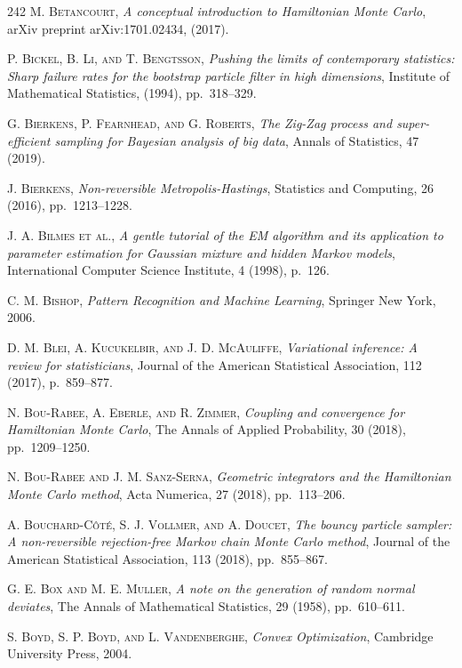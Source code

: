 \begin{thebibliography}{242}
\textsc{M. Betancourt},
\textit{A conceptual introduction to Hamiltonian Monte Carlo},
arXiv preprint arXiv:1701.02434, (2017).

\textsc{P. Bickel, B. Li, and T. Bengtsson},
\textit{Pushing the limits of contemporary statistics: Sharp failure rates for the bootstrap particle filter in high dimensions},
Institute of Mathematical Statistics, (1994), pp.\ 318--329.

\textsc{G. Bierkens, P. Fearnhead, and G. Roberts},
\textit{The Zig-Zag process and super-efficient sampling for Bayesian analysis of big data},
Annals of Statistics, 47 (2019).

\textsc{J. Bierkens},
\textit{Non-reversible Metropolis-Hastings},
Statistics and Computing, 26 (2016), pp.\ 1213--1228.

\textsc{J. A. Bilmes et al.},
\textit{A gentle tutorial of the EM algorithm and its application to parameter estimation for Gaussian mixture and hidden Markov models},
International Computer Science Institute, 4 (1998), p.\ 126.

\textsc{C. M. Bishop},
\textit{Pattern Recognition and Machine Learning},
Springer New York, 2006.

\textsc{D. M. Blei, A. Kucukelbir, and J. D. McAuliffe},
\textit{Variational inference: A review for statisticians},
Journal of the American Statistical Association, 112 (2017), p.\ 859--877.

\textsc{N. Bou-Rabee, A. Eberle, and R. Zimmer},
\textit{Coupling and convergence for Hamiltonian Monte Carlo},
The Annals of Applied Probability, 30 (2018), pp.\ 1209--1250.

\textsc{N. Bou-Rabee and J. M. Sanz-Serna},
\textit{Geometric integrators and the Hamiltonian Monte Carlo method},
Acta Numerica, 27 (2018), pp.\ 113--206.

\textsc{A. Bouchard-C\^ot\'e, S. J. Vollmer, and A. Doucet},
\textit{The bouncy particle sampler: A non-reversible rejection-free Markov chain Monte Carlo method},
Journal of the American Statistical Association, 113 (2018), pp.\ 855--867.

\textsc{G. E. Box and M. E. Muller},
\textit{A note on the generation of random normal deviates},
The Annals of Mathematical Statistics, 29 (1958), pp.\ 610--611.

\textsc{S. Boyd, S. P. Boyd, and L. Vandenberghe},
\textit{Convex Optimization},
Cambridge University Press, 2004.


\end{thebibliography}

